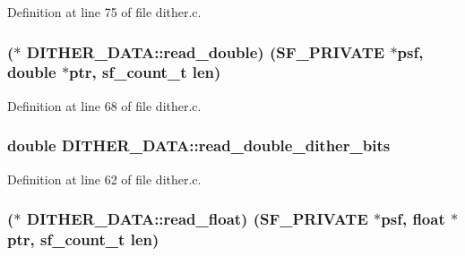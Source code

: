 Definition at line 75 of file dither.\+c.

\subsubsection[{\texorpdfstring{read\+\_\+double}{read_double}}]{($\ast$ D\+I\+T\+H\+E\+R\+\_\+\+D\+A\+T\+A\+::read\+\_\+double) ({\bf S\+F\+\_\+\+P\+R\+I\+V\+A\+TE} $\ast$psf, double $\ast$ptr, {\bf sf\+\_\+count\+\_\+t} {\bf len})}\hypertarget{struct_d_i_t_h_e_r___d_a_t_a_a436d458e737335b82115c145b8c52135}{}\label{struct_d_i_t_h_e_r___d_a_t_a_a436d458e737335b82115c145b8c52135}


Definition at line 68 of file dither.\+c.

\subsubsection[{\texorpdfstring{read\+\_\+double\+\_\+dither\+\_\+bits}{read_double_dither_bits}}]{\setlength{\rightskip}{0pt plus 5cm}double D\+I\+T\+H\+E\+R\+\_\+\+D\+A\+T\+A\+::read\+\_\+double\+\_\+dither\+\_\+bits}\hypertarget{struct_d_i_t_h_e_r___d_a_t_a_afe4d2f2f7773ce39ef2470a9cdd7cbb5}{}\label{struct_d_i_t_h_e_r___d_a_t_a_afe4d2f2f7773ce39ef2470a9cdd7cbb5}


Definition at line 62 of file dither.\+c.

\subsubsection[{\texorpdfstring{read\+\_\+float}{read_float}}]{($\ast$ D\+I\+T\+H\+E\+R\+\_\+\+D\+A\+T\+A\+::read\+\_\+float) ({\bf S\+F\+\_\+\+P\+R\+I\+V\+A\+TE} $\ast$psf, float $\ast$ptr, {\bf sf\+\_\+count\+\_\+t} {\bf len})}\hypertarget{struct_d_i_t_h_e_r___d_a_t_a_ae8e3722d2061031747a5dec2b00ce6a4}{}\label{struct_d_i_t_h_e_r___d_a_t_a_ae8e3722d2061031747a5dec2b00ce6a4}



